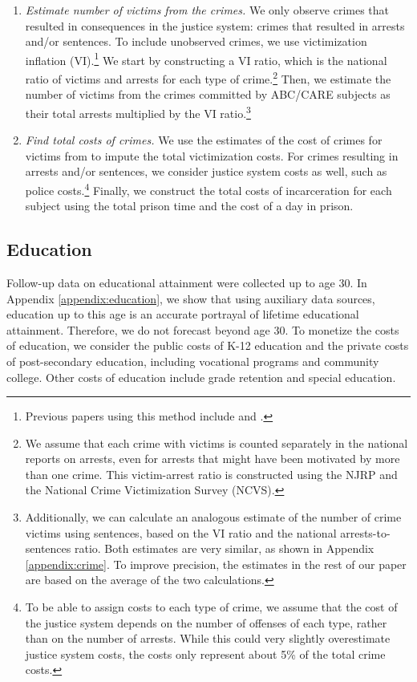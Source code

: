 \begin{enumerate}
\item \textit{Estimate number of victims from the crimes.} We only observe crimes that resulted in consequences in the justice system: crimes that resulted in arrests and/or sentences. To include unobserved crimes, we use victimization inflation (VI).\footnote{Previous papers using this method include \citet{Belfield_Nores_etal_2006_JHR} and \cite{Heckman_Moon_etal_2010_RateofReturn}.} We start by constructing a VI ratio, which is the national ratio of victims and arrests for each type of crime.\footnote{We assume that each crime with victims is counted separately in the national reports on arrests, even for arrests that might have been motivated by more than one crime. This victim-arrest ratio is constructed using the NJRP and the National Crime Victimization Survey (NCVS).} Then, we estimate the number of victims from the crimes committed by ABC/CARE subjects as their total arrests multiplied by the VI ratio.\footnote{Additionally, we can calculate an analogous estimate of the number of crime victims using sentences, based on the VI ratio and the national arrests-to-sentences ratio. Both estimates are very similar, as shown in Appendix \ref{appendix:crime}. To improve precision, the estimates in the rest of our paper are based on the average of the two calculations.}

\item \textit{Find total costs of crimes.} We use the estimates of the cost of crimes for victims from \cite{McCollister_etal_2010_DAD} to impute the total victimization costs. For crimes resulting in arrests and/or sentences, we consider justice system costs as well, such as police costs.\footnote{To be able to assign costs to each type of crime, we assume that the cost of the justice system depends on the number of offenses of each type, rather than on the number of arrests. While this could very slightly overestimate justice system costs, the costs only represent about 5\% of the total crime costs.} Finally, we construct the total costs of incarceration for each subject using the total prison time and the cost of a day in prison.
\end{enumerate}

\subsection{Education}

Follow-up data on educational attainment were collected up to age 30. In Appendix \ref{appendix:education}, we show that using auxiliary data sources, education up to this age is an accurate portrayal of lifetime educational attainment. Therefore, we do not forecast beyond age 30. To monetize the costs of education, we consider the public costs of K-12 education and the private costs of post-secondary education, including vocational programs and community college. Other costs of education include grade retention and special education.

